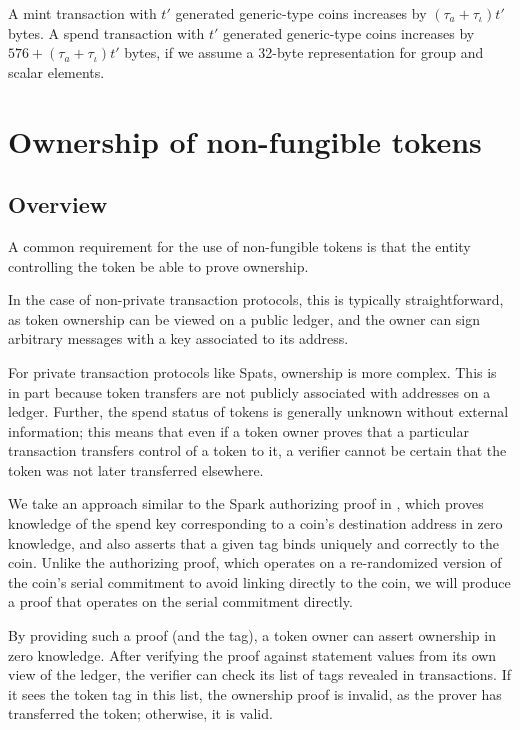 \documentclass{article}
\begin{document}
A mint transaction with $t'$ generated generic-type coins increases by $(\tau_a + \tau_\iota) t'$ bytes.
A spend transaction with $t'$ generated generic-type coins increases by $576 + (\tau_a + \tau_\iota) t'$ bytes, if we assume a 32-byte representation for group and scalar elements.


\section{Ownership of non-fungible tokens}


\subsection{Overview}

A common requirement for the use of non-fungible tokens is that the entity controlling the token be able to prove ownership.

In the case of non-private transaction protocols, this is typically straightforward, as token ownership can be viewed on a public ledger, and the owner can sign arbitrary messages with a key associated to its address.

For private transaction protocols like Spats, ownership is more complex.
This is in part because token transfers are not publicly associated with addresses on a ledger.
Further, the spend status of tokens is generally unknown without external information; this means that even if a token owner proves that a particular transaction transfers control of a token to it, a verifier cannot be certain that the token was not later transferred elsewhere.

We take an approach similar to the Spark authorizing proof in \cite{spark}, which proves knowledge of the spend key corresponding to a coin's destination address in zero knowledge, and also asserts that a given tag binds uniquely and correctly to the coin.
Unlike the authorizing proof, which operates on a re-randomized version of the coin's serial commitment to avoid linking directly to the coin, we will produce a proof that operates on the serial commitment directly.

By providing such a proof (and the tag), a token owner can assert ownership in zero knowledge.
After verifying the proof against statement values from its own view of the ledger, the verifier can check its list of tags revealed in transactions.
If it sees the token tag in this list, the ownership proof is invalid, as the prover has transferred the token; otherwise, it is valid.
\end{document}
